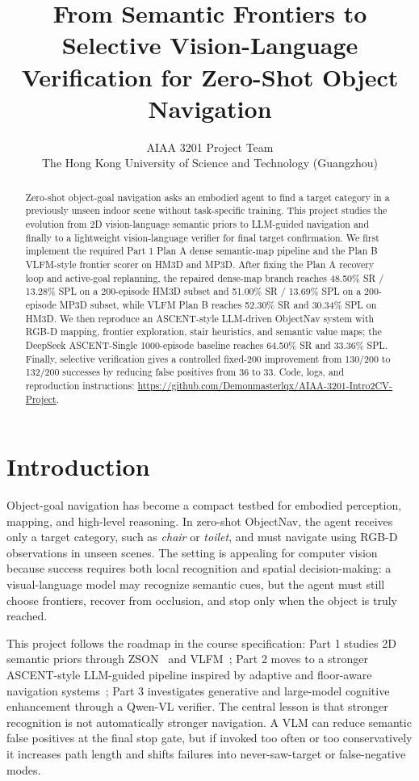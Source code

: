 \documentclass[10pt,twocolumn,letterpaper]{article}
\title{From Semantic Frontiers to Selective Vision-Language Verification for Zero-Shot Object Navigation}
\author{AIAA 3201 Project Team\\
The Hong Kong University of Science and Technology (Guangzhou)\\
}
\begin{document}
\maketitle
\thispagestyle{empty}

\begin{abstract}
Zero-shot object-goal navigation asks an embodied agent to find a target category in a previously unseen indoor scene without task-specific training. This project studies the evolution from 2D vision-language semantic priors to LLM-guided navigation and finally to a lightweight vision-language verifier for final target confirmation. We first implement the required Part 1 Plan A dense semantic-map pipeline and the Plan B VLFM-style frontier scorer on HM3D and MP3D. After fixing the Plan A recovery loop and active-goal replanning, the repaired dense-map branch reaches 48.50\% SR / 13.28\% SPL on a 200-episode HM3D subset and 51.00\% SR / 13.69\% SPL on a 200-episode MP3D subset, while VLFM Plan B reaches 52.30\% SR and 30.34\% SPL on HM3D. We then reproduce an ASCENT-style LLM-driven ObjectNav system with RGB-D mapping, frontier exploration, stair heuristics, and semantic value maps; the DeepSeek ASCENT-Single 1000-episode baseline reaches 64.50\% SR and 33.36\% SPL. Finally, selective verification gives a controlled fixed-200 improvement from 130/200 to 132/200 successes by reducing false positives from 36 to 33. Code, logs, and reproduction instructions: \url{https://github.com/Demonmasterlqx/AIAA-3201-Intro2CV-Project}.
\end{abstract}

\section{Introduction}
Object-goal navigation has become a compact testbed for embodied perception, mapping, and high-level reasoning. In zero-shot ObjectNav, the agent receives only a target category, such as \emph{chair} or \emph{toilet}, and must navigate using RGB-D observations in unseen scenes. The setting is appealing for computer vision because success requires both local recognition and spatial decision-making: a visual-language model may recognize semantic cues, but the agent must still choose frontiers, recover from occlusion, and stop only when the object is truly reached.

This project follows the roadmap in the course specification: Part 1 studies 2D semantic priors through ZSON~\cite{zson2022} and VLFM~\cite{vlfm2024}; Part 2 moves to a stronger ASCENT-style LLM-guided pipeline inspired by adaptive and floor-aware navigation systems~\cite{apexnav2025,stairway2026}; Part 3 investigates generative and large-model cognitive enhancement through a Qwen-VL verifier. The central lesson is that stronger recognition is not automatically stronger navigation. A VLM can reduce semantic false positives at the final stop gate, but if invoked too often or too conservatively it increases path length and shifts failures into never-saw-target or false-negative modes.
\end{document}
